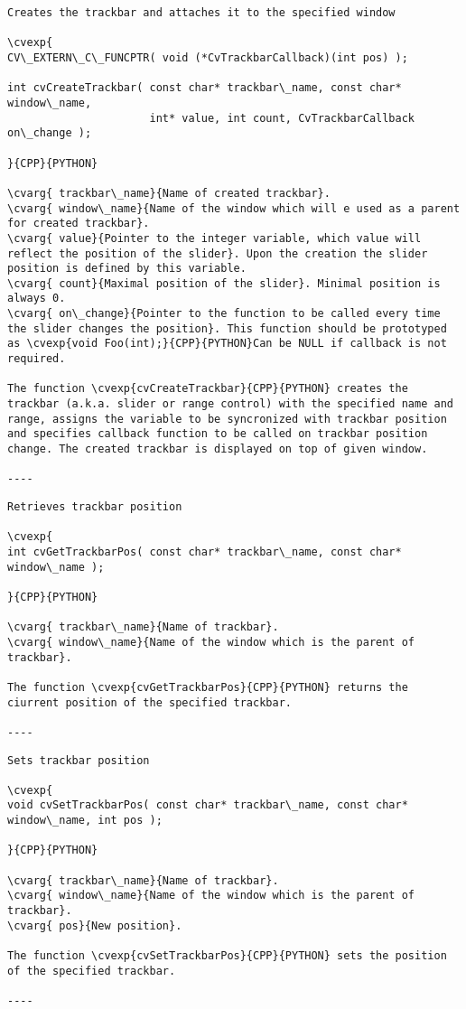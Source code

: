 \begin{verbatim}
Creates the trackbar and attaches it to the specified window

\cvexp{
CV\_EXTERN\_C\_FUNCPTR( void (*CvTrackbarCallback)(int pos) );

int cvCreateTrackbar( const char* trackbar\_name, const char* window\_name,
                      int* value, int count, CvTrackbarCallback on\_change );

}{CPP}{PYTHON}

\cvarg{ trackbar\_name}{Name of created trackbar}.
\cvarg{ window\_name}{Name of the window which will e used as a parent for created trackbar}.
\cvarg{ value}{Pointer to the integer variable, which value will reflect the position of the slider}. Upon the creation the slider position is defined by this variable.
\cvarg{ count}{Maximal position of the slider}. Minimal position is always 0.
\cvarg{ on\_change}{Pointer to the function to be called every time the slider changes the position}. This function should be prototyped as \cvexp{void Foo(int);}{CPP}{PYTHON}Can be NULL if callback is not required.

The function \cvexp{cvCreateTrackbar}{CPP}{PYTHON} creates the trackbar (a.k.a. slider or range control) with the specified name and range, assigns the variable to be syncronized with trackbar position and specifies callback function to be called on trackbar position change. The created trackbar is displayed on top of given window.

----
\end{verbatim}
\begin{verbatim}
Retrieves trackbar position

\cvexp{
int cvGetTrackbarPos( const char* trackbar\_name, const char* window\_name );

}{CPP}{PYTHON}

\cvarg{ trackbar\_name}{Name of trackbar}.
\cvarg{ window\_name}{Name of the window which is the parent of trackbar}.

The function \cvexp{cvGetTrackbarPos}{CPP}{PYTHON} returns the ciurrent position of the specified trackbar.

----
\end{verbatim}
\begin{verbatim}
Sets trackbar position

\cvexp{
void cvSetTrackbarPos( const char* trackbar\_name, const char* window\_name, int pos );

}{CPP}{PYTHON}

\cvarg{ trackbar\_name}{Name of trackbar}.
\cvarg{ window\_name}{Name of the window which is the parent of trackbar}.
\cvarg{ pos}{New position}.

The function \cvexp{cvSetTrackbarPos}{CPP}{PYTHON} sets the position of the specified trackbar.

----
\end{verbatim}
